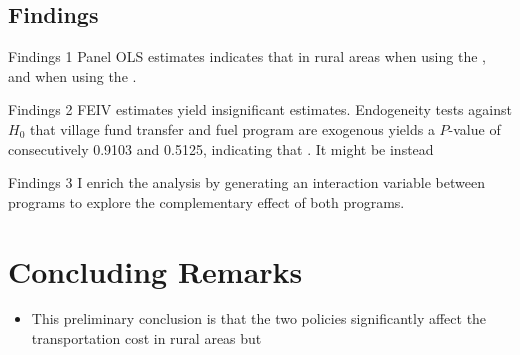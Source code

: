 \documentclass[
11pt,notheorems,compress,hyperref={pdfauthor=Maghfira Ramadhani}
]{beamer}
\begin{document}
\subsection{Findings}
\begin{frame}
    \begin{block}{Findings 1}
        Panel OLS estimates indicates that  in rural areas when using the , and  when using the . \hyperlink{POLS}{}\label{POLSclick}
    \end{block}
    \pause\begin{block}{Findings 2}
        FEIV estimates yield insignificant estimates. Endogeneity tests against $H_0$ that village fund transfer and fuel program are exogenous yields a $P$-value of consecutively 0.9103 and 0.5125, indicating that . It might be  instead \hyperlink{FEIV}{}\label{FEIVclick} \hyperlink{FEIV2}{}
    \end{block}
    \begin{block}{Findings 3}
        I enrich the analysis by generating an interaction variable between programs to explore the complementary effect of both programs. \hyperlink{POLS2}{}
    \end{block}
\end{frame}

   

\section{Concluding Remarks}
\begin{frame}
    \begin{itemize}
        \item This preliminary conclusion is that the two policies significantly affect the transportation cost in rural areas but 
    \end{itemize}
\end{frame}
\end{document}
